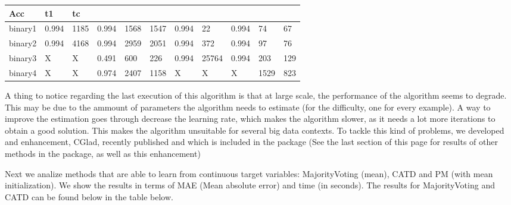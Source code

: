 \documentclass[letterpaper,10pt,english]{sphinxmanual}
\begin{document}
\begin{savenotes}
\begin{tabulary}{\linewidth}[t]{|T|T|T|T|T|T|T|T|T|T|T|}
Acc
&\sphinxstyletheadfamily 
t1
&\sphinxstyletheadfamily 
tc
\\
\hline
binary1
&
0.994
&
1185
&
0.994
&
1568
&
1547
&
0.994
&
22
&
0.994
&
74
&
67
\\
\hline
binary2
&
0.994
&
4168
&
0.994
&
2959
&
2051
&
0.994
&
372
&
0.994
&
97
&
76
\\
\hline
binary3
&
X
&
X
&
0.491
&
600
&
226
&
0.994
&
25764
&
0.994
&
203
&
129
\\
\hline
binary4
&
X
&
X
&
0.974
&
2407
&
1158
&
X
&
X
&
X
&
1529
&
823
\\
\hline
\end{tabulary}
\par
\sphinxattableend\end{savenotes}

A thing to notice regarding the last execution of this algorithm is that at large scale, the performance of the
algorithm seems to degrade. This may be due to the ammount of parameters the algorithm needs to estimate (for the
difficulty, one for every example). A way to improve the estimation goes through decrease the learning rate, which
makes the algorithm slower, as it needs a lot more iterations to obtain a good solution. This makes the algorithm
unsuitable for several big data contexts.  To tackle this kind of problems, we developed and enhancement, CGlad, recently
published and which is included in the package (See the last section of this page for results of other
methods in the package, as well as this enhancement)

Next we analize methods that are able to learn from continuous target variables: MajorityVoting (mean), CATD and PM (with mean initialization). We show the results in terms of MAE (Mean absolute error) and time (in seconds). The
results for MajorityVoting and CATD can be found below in the table below.
\end{document}
